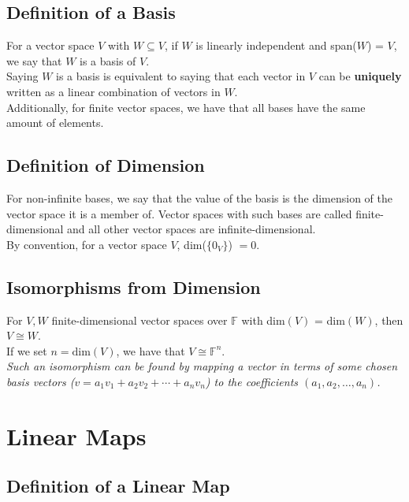 \documentclass[a4paper, 12pt, twoside]{article}
\begin{document}
\subsection{Definition of a Basis}

For a vector space $V$ with $W \subseteq V$, if $W$ is linearly independent
and span($W$) = $V$, we say that $W$ is a basis of $V$.
\\[\baselineskip]
Saying $W$ is a basis is equivalent to saying that each vector in $V$ can
be \textbf{uniquely} written as a linear combination of vectors in $W$.
\\[\baselineskip]
Additionally, for finite vector spaces, we have that all bases have the same
amount of elements.

\subsection{Definition of Dimension}

For non-infinite bases, we say that the value of the basis is the dimension
of the vector space it is a member of. Vector spaces with such bases are called
finite-dimensional and all other vector spaces are infinite-dimensional.
\\[\baselineskip]
By convention, for a vector space $V$, dim($\{0_V\}$) $= 0$.

\newpage

\subsection{Isomorphisms from Dimension}

For $V, W$ finite-dimensional vector spaces over $\mathbb{F}$
with dim$(V)$ = dim$(W)$, then $V \cong W$.
\\[\baselineskip]
If we set $n = \text{dim}(V)$, we have that $V \cong \mathbb{F}^{n}$.
\\[\baselineskip]
\textit{Such an isomorphism can be found by mapping a vector in
terms of some chosen basis vectors 
($v = a_1v_1 + a_2v_2 + \cdots + a_nv_n$) to the coefficients
$(a_1, a_2, \ldots, a_n)$.}

\section{Linear Maps}

\subsection{Definition of a Linear Map}
\end{document}
